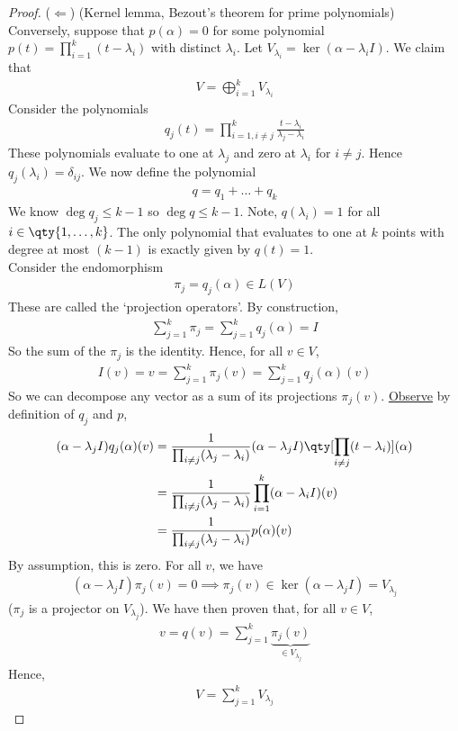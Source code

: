 \begin{proof}
	($\Longleftarrow$) (Kernel lemma, Bezout's theorem for prime polynomials) \\
	Conversely, suppose that $p(\alpha) = 0$ for some polynomial $p(t) = \prod_{i=1}^k (t-\lambda_i)$ with distinct $\lambda_i$.
	Let $V_{\lambda_i} = \ker(\alpha - \lambda_i I)$.
	We claim that
	\begin{align*}
		V = \bigoplus_{i=1}^k V_{\lambda_i}
	\end{align*}
	Consider the polynomials
	\begin{align*}
		q_j(t) = \prod_{i=1,i \neq j}^k \frac{t-\lambda_i}{\lambda_j - \lambda_i}
	\end{align*}
	These polynomials evaluate to one at $\lambda_j$ and zero at $\lambda_i$ for $i \neq j$.
	Hence $q_j(\lambda_i) = \delta_{ij}$.
	We now define the polynomial
	\begin{align*}
		q = q_1 + \dots + q_k
	\end{align*}
	We know $\deg q_j \leq k-1$ so $\deg q \leq k -1$.
	Note, $q(\lambda_i) = 1$ for all $i \in \qty{1, \dots, k}$.
	The only polynomial that evaluates to one at $k$ points with degree at most $(k-1)$ is exactly given by $q(t) = 1$. \\
	Consider the endomorphism
	\begin{align*}
		\pi_j = q_j(\alpha) \in L(V)
	\end{align*}
	These are called the `projection operators'.
	By construction,
	\begin{align*}
		\sum_{j=1}^k \pi_j = \sum_{j=1}^k q_j(\alpha) = I
	\end{align*}
	So the sum of the $\pi_j$ is the identity.
	Hence, for all $v \in V$,
	\begin{align*}
		I(v) = v = \sum_{j=1}^k \pi_j(v) = \sum_{j=1}^k q_j(\alpha)(v)
	\end{align*}
	So we can decompose any vector as a sum of its projections $\pi_j(v)$.
	\underline{Observe} by definition of $q_j$ and $p$,
	\begin{align*}
		(\alpha - \lambda_j I) q_j(\alpha)(v) & = \frac{1}{\prod_{i \neq j} (\lambda_j - \lambda_i)} (\alpha - \lambda_j I) \qty[\prod_{i \neq j} (t - \lambda_i)] (\alpha) \\
		& = \frac{1}{\prod_{i \neq j} (\lambda_j - \lambda_i)} \prod_{i=1}^k (\alpha - \lambda_i I)(v) \\
		& = \frac{1}{\prod_{i \neq j} (\lambda_j - \lambda_i)} p(\alpha)(v)
	\end{align*}
	By assumption, this is zero.
	For all $v$, we have
	\begin{align*}
		(\alpha - \lambda_j I) \pi_j(v) = 0 \implies \pi_j(v) \in \ker(\alpha - \lambda_j I) = V_{\lambda_j}
	\end{align*}
	($\pi_j$ is a projector on $V_{\lambda_j}$).
	We have then proven that, for all $v \in V$,
	\begin{align*}
		v = q(v) = \sum_{j=1}^k \underbrace{\pi_j(v)}_{\in V_{\lambda_j}}
	\end{align*}
	Hence,
	\begin{align*}
		V = \sum_{j=1}^k V_{\lambda_j}
	\end{align*}


\end{proof}
